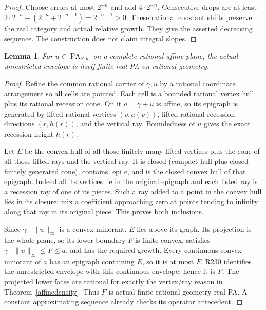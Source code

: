 \documentclass[11pt]{article}
\newtheorem{lemma}[theorem]{Lemma}
\newcommand{\R}{\mathbb R}
\newcommand{\PA}{\operatorname{PA}}
\begin{document}
\begin{proof}
Choose errors at most $2^{-n}$ and add $4\cdot2^{-n}$. Consecutive
drops are at least
$2\cdot2^{-n}-(2^{-n}+2^{-n-1})=2^{-n-1}>0$.
These rational constant shifts preserve the real category and actual
relative growth. They give the asserted decreasing sequence. The
construction does not claim integral slopes.
\end{proof}

\begin{lemma}\label{finiteenvelope}
For $u\in\PA_{\R,b}$ on a complete rational affine plane, the actual
unrestricted envelope is itself finite real PA on rational geometry.
\end{lemma}
\begin{proof}
Refine the common rational carrier of $\gamma,u$ by a rational
coordinate arrangement so all cells are pointed. Each cell is a
bounded rational vertex hull plus its rational recession cone.
On it $a=\gamma+u$ is affine, so its epigraph is generated by
lifted rational vertices $(v,a(v))$, lifted rational recession
directions $(r,h(r))$, and the vertical ray. Boundedness of $u$
gives the exact recession height $h(r)$.

Let $E$ be the convex hull of all those finitely many lifted vertices
plus the cone of all those lifted rays and the vertical ray. It is
closed (compact hull plus closed finitely generated cone), contains
$\operatorname{epi}a$, and is the closed convex hull of that epigraph.
Indeed all its vertices lie in the original epigraph and each listed
ray is a recession ray of one of its pieces. Such a ray added to a
point in the convex hull lies in its closure: mix a coefficient
approaching zero at points tending to infinity along that ray in its
original piece. This proves both inclusions.

Since $\gamma-\|u\|_\infty$ is a convex minorant, $E$ lies above
its graph. Its projection is the whole plane, so its lower boundary
$F$ is finite convex, satisfies $\gamma-\|u\|_\infty\leq F\leq a$,
and has the required growth. Every continuous convex minorant of
$a$ has an epigraph containing $E$, so it is at most $F$. R230
identifies the unrestricted envelope with this continuous envelope;
hence it is $F$. The projected lower faces are rational for exactly
the vertex/ray reason in Theorem~\ref{affinedensity}. Thus $F$ is
actual finite rational-geometry real PA. A constant approximating
sequence already checks its operator antecedent.
\end{proof}
\end{document}
